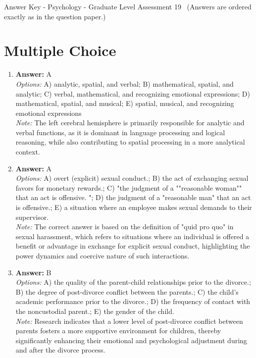 \documentclass[12pt]{article}
\begin{document}
\begin{center}
Answer Key - Psychology - Graduate Level Assessment 19 \
\small (Answers are ordered exactly as in the question paper.)
\end{center}

\section*{Multiple Choice}
\begin{enumerate}[label=\arabic*.]
\item \textbf{Answer:} A
\\ \textit{Options:} A) analytic, spatial, and verbal; B) mathematical, spatial, and analytic; C) verbal, mathematical, and recognizing emotional expressions; D) mathematical, spatial, and musical; E) spatial, musical, and recognizing emotional expressions
\\ \textit{Note:} The left cerebral hemisphere is primarily responsible for analytic and verbal functions, as it is dominant in language processing and logical reasoning, while also contributing to spatial processing in a more analytical context.
\item \textbf{Answer:} A
\\ \textit{Options:} A) overt (explicit) sexual conduct.; B) the act of exchanging sexual favors for monetary rewards.; C) "the judgment of a ""reasonable woman"" that an act is offensive. "; D) the judgment of a "reasonable man" that an act is offensive.; E) a situation where an employee makes sexual demands to their supervisor.
\\ \textit{Note:} The correct answer is based on the definition of "quid pro quo" in sexual harassment, which refers to situations where an individual is offered a benefit or advantage in exchange for explicit sexual conduct, highlighting the power dynamics and coercive nature of such interactions.
\item \textbf{Answer:} B
\\ \textit{Options:} A) the quality of the parent-child relationships prior to the divorce.; B) the degree of post-divorce conflict between the parents.; C) the child's academic performance prior to the divorce.; D) the frequency of contact with the noncustodial parent.; E) the gender of the child.
\\ \textit{Note:} Research indicates that a lower level of post-divorce conflict between parents fosters a more supportive environment for children, thereby significantly enhancing their emotional and psychological adjustment during and after the divorce process.

\end{enumerate}
\end{document}
